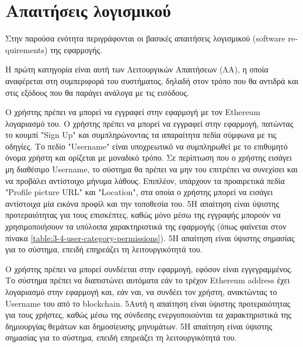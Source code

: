 \section{Απαιτήσεις λογισμικού} \label{section:3-5-software-requirements}

Στην παρούσα ενότητα περιγράφονται οι βασικές απαιτήσεις λογισμικού (\textenglish{software requirements}) της εφαρμογής.

Η πρώτη κατηγορία είναι αυτή των Λειτουργικών Απαιτήσεων (ΛΑ), η οποία αναφέρεται στη συμπεριφορά του συστήματος, δηλαδή στον τρόπο που θα αντιδρά και στις εξόδους που θα παράγει ανάλογα με τις εισόδους.

\begin{enumerate}[label=\textbf{<ΛΑ-\arabic*>}, leftmargin=\parindent, align=left, labelwidth=\parindent, labelsep=0pt]
	\sysReqItem
		{\label{srs:functional-srs-sign-up}}
		{Ο χρήστης πρέπει να μπορεί να εγγραφεί στην εφαρμογή με τον Ethereum λογαριασμό του.}
		{Ο χρήστης πρέπει να μπορεί να εγγραφεί στην εφαρμογή, πατώντας το κουμπί "Sign Up" και συμπληρώνοντας τα απαραίτητα πεδία σύμφωνα με τις οδηγίες. Το πεδίο "Username" είναι υποχρεωτικό να συμπληρωθεί με το επιθυμητό όνομα χρήστη και ορίζεται με μοναδικό τρόπο. Σε περίπτωση που ο χρήστης εισάγει μη διαθέσιμο Username, το σύστημα θα πρέπει να μην του επιτρέπει να συνεχίσει και να προβάλει αντίστοιχο μήνυμα λάθους. Επιπλέον, υπάρχουν τα προαιρετικά πεδία "Profile picture URL" και "Location", στα οποία ο χρήστης μπορεί να εισάγει αντίστοιχα μία εικόνα προφίλ και την τοποθεσία του.}
		{5}{Η απαίτηση είναι ύψιστης προτεραιότητας για τους επισκέπτες, καθώς μόνο μέσω της εγγραφής μπορούν να χρησιμοποιήσουν τα υπόλοιπα χαρακτηριστικά της εφαρμογής (όπως φαίνεται στον πίνακα \ref{table:3-4-user-category-permissions}).}
		{5}{Η απαίτηση είναι ύψιστης σημασίας για το σύστημα, επειδή επηρεάζει τη λειτουργικότητά του.}

	\sysReqItem
		{\label{srs:functional-srs-sign-in}}
		{Ο χρήστης πρέπει να μπορεί συνδέεται στην εφαρμογή, εφόσον είναι εγγεγραμμένος.}
		{Το σύστημα πρέπει να διαπιστώνει αυτόματα εάν το τρέχον Ethereum address έχει λογαριασμό στην εφαρμογή και, εάν ναι, να συνδέει τον χρήστη, ανακτώντας το Username του από το blockchain.}
		{5}{Αυτή η απαίτηση είναι ύψιστης προτεραιότητας για τους χρήστες, καθώς μέσω της σύνδεσης ενεργοποιούνται τα χαρακτηριστικά της δημιουργίας θεμάτων και δημοσίευσης μηνυμάτων.}
		{5}{Η απαίτηση είναι ύψιστης σημασίας για το σύστημα, επειδή επηρεάζει τη λειτουργικότητά του.}


\end{enumerate}
